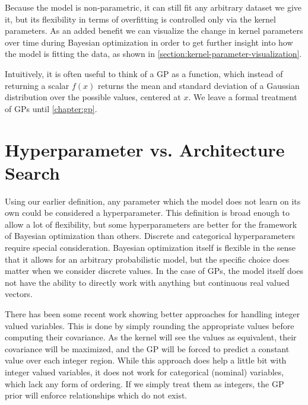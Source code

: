 Because the model is non-parametric, it can still fit any arbitrary dataset we give it, but its flexibility in terms of overfitting is controlled only via the kernel parameters. As an added benefit we can visualize the change in kernel parameters over time during Bayesian optimization in order to get further insight into how the model is fitting the data, as shown in \autoref{section:kernel-parameter-visualization}.

Intuitively, it is often useful to think of a GP as a function, which instead
of returning a scalar $f(x)$ returns the mean and standard deviation of a
Gaussian distribution over the possible values, centered at $x$. We leave a formal
treatment of GPs until \autoref{chapter:gp}.


%
%
%
%
%

\section{Hyperparameter vs. Architecture Search}
\label{section:architecture-search}

Using our earlier definition, any parameter which the model does not learn on
its own could be considered a hyperparameter. This definition is broad enough
to allow a lot of flexibility, but some hyperparameters are better for the
framework of Bayesian optimization than others. Discrete and categorical
hyperparameters require special consideration. Bayesian optimization itself is
flexible in the sense that it allows for an arbitrary probabilistic model, but
the specific choice does matter when we consider discrete values. In the case
of GPs, the model itself does not have the ability to directly work with
anything but continuous real valued vectors.

There has been some recent work \citep{integer-valued-gp} showing better
approaches for handling integer valued variables. This is done by simply
rounding the appropriate values before computing their covariance. As the
kernel will see the values as equivalent, their covariance will be maximized,
and the GP will be forced to predict a constant value over each integer region.
While this approach does help a little bit with integer valued variables, it
does not work for categorical (nominal) variables, which lack any form of
ordering. If we simply treat them as integers, the GP prior will enforce
relationships which do not exist.


